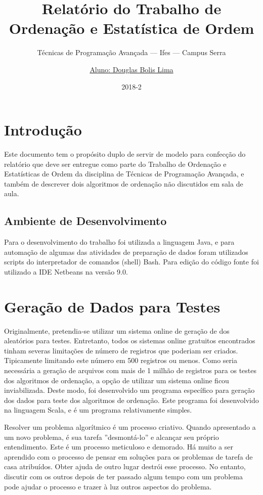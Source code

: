 \documentclass[a4paper,12pt]{scrartcl}
\title{Relatório do Trabalho de Ordenação e Estatística de Ordem}
\subtitle{Técnicas de Programação Avançada --- Ifes --- Campus Serra}
\author{\underline{Aluno: Douglas Bolis Lima}}
\date{2018-2}
\begin{document}
\maketitle

\tableofcontents

\section{Introdução}

Este documento tem o propósito duplo de servir de modelo para confecção do relatório que deve ser entregue como parte do Trabalho de Ordenação e Estatísticas de Ordem da disciplina de Técnicas de Programação Avançada, e também de descrever dois algoritmos de ordenação não discutidos em sala de aula.

\subsection{Ambiente de Desenvolvimento}

Para o desenvolvimento do trabalho foi utilizada a linguagem Java, e para automação de algumas das atividades de preparação de dados foram utilizados scripts do interpretador de comandos (shell) Bash.
Para edição do código fonte foi utilizado a IDE Netbeans na versão 9.0.

\section{Geração de Dados para Testes}

Originalmente, pretendia-se utilizar um sistema online de geração de dos aleatórios para testes. Entretanto, todos os sistemas online gratuitos encontrados tinham severas limitações de número de registros que poderiam ser criados. Tipicamente limitando este número em 500 registros ou menos. Como seria necessária a geração de arquivos com mais de 1 milhão de registros para os testes dos algoritmos de ordenação, a opção de utilizar um sistema online ficou inviabilizada.
Deste modo, foi desenvolvido um programa específico para geração dos dados para teste dos algoritmos de ordenação. Este programa foi desenvolvido na linguagem Scala, e é um programa relativamente simples.

\label{sec:polit-de-colab}

Resolver um problema algorítmico é um processo criativo. Quando apresentado a um
novo problema, é sua tarefa ''desmontá-lo'' e alcançar seu próprio entendimento.
Este é um processo meticuloso e demorado. Há muito a ser aprendido com o
processo de pensar em soluções para os problemas de tarefa de casa atribuídos.
Obter ajuda de outro lugar destrói esse processo. No entanto, discutir com os
outros depois de ter passado algum tempo com um problema pode ajudar o processo
e trazer à luz outros aspectos do problema.
\end{document}
